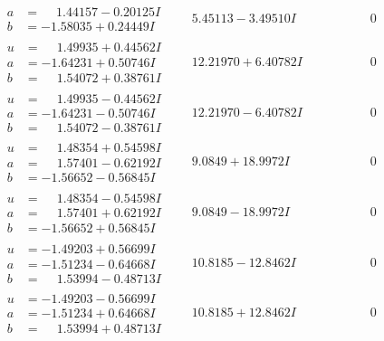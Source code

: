 \documentclass[1p]{elsarticle_modified}
\theoremstyle{definition}
\begin{document}
$$\begin{array}{c|c|c}
\begin{aligned}
a &= \phantom{-}1.44157 - 0.20125 I \\
b &= -1.58035 + 0.24449 I\end{aligned}
 & \phantom{-}5.45113 - 3.49510 I & \phantom{-0.000000 } 0 \\ \hline\begin{aligned}
u &= \phantom{-}1.49935 + 0.44562 I \\
a &= -1.64231 + 0.50746 I \\
b &= \phantom{-}1.54072 + 0.38761 I\end{aligned}
 & \phantom{-}12.21970 + 6.40782 I & \phantom{-0.000000 } 0 \\ \hline\begin{aligned}
u &= \phantom{-}1.49935 - 0.44562 I \\
a &= -1.64231 - 0.50746 I \\
b &= \phantom{-}1.54072 - 0.38761 I\end{aligned}
 & \phantom{-}12.21970 - 6.40782 I & \phantom{-0.000000 } 0 \\ \hline\begin{aligned}
u &= \phantom{-}1.48354 + 0.54598 I \\
a &= \phantom{-}1.57401 - 0.62192 I \\
b &= -1.56652 - 0.56845 I\end{aligned}
 & \phantom{-}9.0849 + 18.9972 I & \phantom{-0.000000 } 0 \\ \hline\begin{aligned}
u &= \phantom{-}1.48354 - 0.54598 I \\
a &= \phantom{-}1.57401 + 0.62192 I \\
b &= -1.56652 + 0.56845 I\end{aligned}
 & \phantom{-}9.0849 - 18.9972 I & \phantom{-0.000000 } 0 \\ \hline\begin{aligned}
u &= -1.49203 + 0.56699 I \\
a &= -1.51234 - 0.64668 I \\
b &= \phantom{-}1.53994 - 0.48713 I\end{aligned}
 & \phantom{-}10.8185 - 12.8462 I & \phantom{-0.000000 } 0 \\ \hline\begin{aligned}
u &= -1.49203 - 0.56699 I \\
a &= -1.51234 + 0.64668 I \\
b &= \phantom{-}1.53994 + 0.48713 I\end{aligned}
 & \phantom{-}10.8185 + 12.8462 I & \phantom{-0.000000 } 0 \\ \hline\begin{aligned}

\end{aligned}
\end{array}$$
\end{document}

